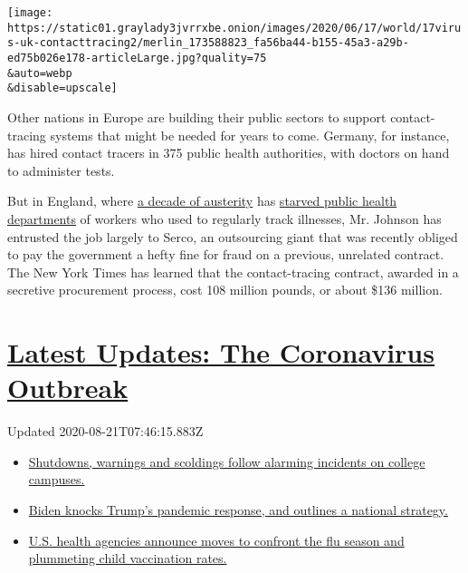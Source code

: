 \texttt{[image: https://static01.graylady3jvrrxbe.onion/images/2020/06/17/world/17virus-uk-contacttracing2/merlin\_173588823\_fa56ba44-b155-45a3-a29b-ed75b026e178-articleLarge.jpg?quality=75\\\&auto=webp\\\&disable=upscale]}

Other nations in Europe are building their public sectors to support
contact-tracing systems that might be needed for years to come. Germany,
for instance, has hired contact tracers in 375 public health
authorities, with doctors on hand to administer tests.

But in England, where
\href{https://www.nytimes3xbfgragh.onion/2019/02/24/world/europe/britain-austerity-may-budget.html}{a
decade of austerity} has
\href{https://www.local.gov.uk/sites/default/files/documents/LGA\%20briefing\%20-\%20health\%20and\%20local\%20public\%20health\%20cuts\%20-\%20HoC\%20140519\%20WEB.pdf}{starved
public health departments} of workers who used to regularly track
illnesses, Mr. Johnson has entrusted the job largely to Serco, an
outsourcing giant that was recently obliged to pay the government a
hefty fine for fraud on a previous, unrelated contract. The New York
Times has learned that the contact-tracing contract, awarded in a
secretive procurement process, cost 108 million pounds, or about \$136
million.

\hypertarget{latest-updates-the-coronavirus-outbreak}{%
\section{\texorpdfstring{\href{https://www.nytimes3xbfgragh.onion/2020/08/20/world/coronavirus-covid.html?action=click\&pgtype=Article\&state=default\&region=MAIN_CONTENT_1\&context=storylines_live_updates}{Latest
Updates: The Coronavirus
Outbreak}}{Latest Updates: The Coronavirus Outbreak}}\label{latest-updates-the-coronavirus-outbreak}}

Updated 2020-08-21T07:46:15.883Z

\begin{itemize}
\tightlist
\item
  \href{https://www.nytimes3xbfgragh.onion/2020/08/20/world/coronavirus-covid.html?action=click\&pgtype=Article\&state=default\&region=MAIN_CONTENT_1\&context=storylines_live_updates\#link-68774d88}{Shutdowns,
  warnings and scoldings follow alarming incidents on college campuses.}
\item
  \href{https://www.nytimes3xbfgragh.onion/2020/08/20/world/coronavirus-covid.html?action=click\&pgtype=Article\&state=default\&region=MAIN_CONTENT_1\&context=storylines_live_updates\#link-26b58724}{Biden
  knocks Trump's pandemic response, and outlines a national strategy.}
\item
  \href{https://www.nytimes3xbfgragh.onion/2020/08/20/world/coronavirus-covid.html?action=click\&pgtype=Article\&state=default\&region=MAIN_CONTENT_1\&context=storylines_live_updates\#link-4e542da3}{U.S.
  health agencies announce moves to confront the flu season and
  plummeting child vaccination rates.}
\end{itemize}

